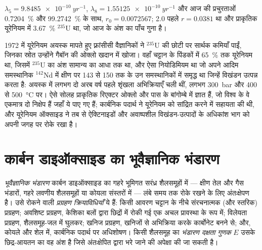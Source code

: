 $\lambda_5 = \qty{9.8485e-10}{yr^{-1}}$, $\lambda_8 = \qty{1.55125e-10}{yr^{-1}}$ और आज की
प्रचुरताओं \qty{0.7204}{\percent} और \qty{99.2742}{\percent} के साथ, $r_0 = 0.0072567$; \qty{2.0}{\Ga}
पहले $r = 0.0381$ था और प्राकृतिक यूरेनियम में \qty{3.67}{\percent} $^{235}$U था, जो आज के अंश का
पाँच गुना है।

\begin{history}[दो अरब वर्ष पुराना एक रिएक्टर]
1972 में यूरेनियम अयस्क मापते हुए फ़्रांसीसी वैज्ञानिकों ने $^{235}$U की छोटी पर सार्थक कमियाँ पाईं, जिनका स्रोत
उन्होंने गैबॉन की ओक्लो खदान में खोजा। वहाँ चट्टान के पिंडकों में
\qty{65}{\percent} तक यूरेनियम था, जिसमें $^{235}$U का अंश सामान्य का आधा तक था, और ऐसा नियोडिमियम था
जो अपने आदिम समस्थानिक $^{142}$Nd में क्षीण पर 143 से 150 तक के उन समस्थानिकों में समृद्ध था जिन्हें विखंडन
उत्पन्न करता है: अयस्क में लगभग दो अरब वर्ष पहले शृंखला अभिक्रियाएँ चली थीं, लगभग \qty{300}{bar}
और 400 से \qty{500}{\celsius} पर। ऐसे सोलह प्राकृतिक रिएक्टर ओक्लो और पास के
बांगोम्बे में ज्ञात हैं, जो विश्व के वे एकमात्र दो निक्षेप हैं जहाँ ये पाए गए हैं; कार्बनिक पदार्थ ने यूरेनियम को
सांद्रित करने में सहायता की थी, और यूरेनियम ऑक्साइड ने तब से ऐक्टिनाइडों और
अवाष्पशील विखंडन-उत्पादों के अधिकांश भाग को अपनी जगह पर रोके रखा है।
\end{history}

\section{कार्बन डाइऑक्साइड का भूवैज्ञानिक भंडारण}\label{sec:b2:energy-geology:ccs}

\begin{definition}[भूवैज्ञानिक \ce{CO2} भंडारण, प्रग्रहण क्रियाविधियाँ, भंडारण दक्षता गुणक]\label{def:b2:energy-geology:ccs}
\emph{भूवैज्ञानिक  भंडारण} कार्बन डाइऑक्साइड का गहरे
भूमिगत सरंध्र शैलसमूहों में --- क्षीण तेल और गैस भंडारों, गहरे लवणीय शैलसमूहों या कोयला संस्तरों में ---
लंबे समय तक रोके रखने के लिए अंतःक्षेपण है। उसे रोकने वाली \emph{ प्रग्रहण
क्रियाविधियाँ} ये हैं: किसी आवरण चट्टान के नीचे संरचनात्मक (और स्तरिक)
प्रग्रहण; अवशिष्ट प्रग्रहण, केशिका बलों द्वारा छिद्रों में रोकी गई एक अचल प्रावस्था के रूप में;
विलेयता प्रग्रहण, शैलसमूह-जल में घुलकर; खनिज प्रग्रहण, खनिजों से अभिक्रिया करके कार्बोनेट बनने से;
और, कोयले और शेल में, कार्बनिक पदार्थ पर अधिशोषण। किसी शैलसमूह का \emph{भंडारण दक्षता गुणक}
$E$ उसके छिद्र-आयतन का वह अंश है जिसे अंतःक्षेपित
 द्वारा भरे जाने की अपेक्षा की जा सकती है।
\end{definition}


